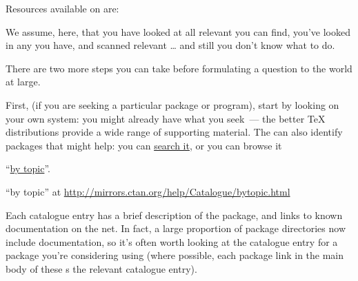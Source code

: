 Resources available on  are:
\begin{ctanrefs}
\item[\nothtml{\rmfamily}Dante \acro{FAQ}]
\item[\nothtml{\rmfamily}French \acro{FAQ}]
\item[\nothtml{\rmfamily}Sources of this \acro{FAQ}]
\item[\nothtml{\rmfamily}Obsolete \texttt{comp.text.tex} \acro{FAQ}]%
\item[\nothtml{\rmfamily}The visual \acro{FAQ}]
\end{ctanrefs}


We assume, here, that you have looked at all relevant
 you can find, you've looked in
any  you have, and scanned relevant
\dots{} and still you don't know what
to do.

There are two more steps you can take before formulating a question to
the \tex{} world at large.

First, (if you are seeking a particular package or program), start by
looking on your own system: you might already have what you seek~---
the better \TeX{} distributions provide a wide range of supporting
material.  The  can also
identify packages that might help: you can %
\href{http://www.tex.ac.uk/search}{search it}, or you can browse it
\begin{hyperversion}
``\href{http://mirrors.ctan.org/help/Catalogue/bytopic.html}{by topic}''.
\end{hyperversion}
\begin{flatversion}
``by topic'' at
\url{http://mirrors.ctan.org/help/Catalogue/bytopic.html} 
\end{flatversion}
Each catalogue entry has a brief description of the package, and links to
known documentation on the net.  In fact, a large proportion of
 package directories now include documentation, so it's
often worth looking at the catalogue entry for a package you're considering
using (where possible, each package link in the main body of these
s 
the relevant catalogue entry).

